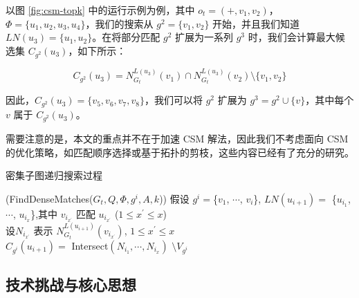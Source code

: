 以图 \ref{fig:csm-topk} 中的运行示例为例，其中 $o_t = (+,v_1,v_2)$，$\Phi = \{u_1,u_2,u_3,u_4\}$，我们的搜索从 $g^2 = \{v_1,v_2\}$ 开始，并且我们知道 $LN(u_3) = \{u_1, u_2\}$。在将部分匹配 $g^2$ 扩展为一系列 $g^3$ 时，我们会计算最大候选集 $C_{g^{2}}(u_3)$，如下所示：

\[
	C_{g^{2}}(u_{3}) =  N_{G_t}^{L(u_{3})}(v_{1})\cap N_{G_t}^{L(u_{3})}(v_{2})  \setminus \{v_1, v_2\}
\]

因此，$C_{g^{2}}(u_3) = \{v_5, v_6, v_7, v_8\}$，我们可以将 $g^2$ 扩展为 $g^3 = g^2 \cup \{v\}$，其中每个 $v$ 属于 $C_{g^{2}}(u_3)$。

需要注意的是，本文的重点并不在于加速 CSM 解法，因此我们不考虑面向 CSM 的优化策略，如匹配顺序选择或基于拓扑的剪枝，这些内容已经有了充分的研究。


\begin{algorithm}[h!]
	\small
	\caption{密集子图递归搜索过程}
	\label{alg:find-dense-matches}
	\iFunc(FindDenseMatches{(}$G_t, Q, \Phi, g^i, A, k${)})
	{
		假设 $g^{i}=$\{$v_{1}$, $\cdots$, $v_{i}$\}, $LN(u_{i+1})=$ \{$u_{i_1}$, $\cdots$, $u_{i_x}$\},其中 $v_{i_{x^\prime}}$ 匹配 $u_{i_{x^\prime}}$ ($1\leq x^\prime\leq x$)  \label{code:base-extension:begin} \\
		设$N_{i_{x^\prime}}$ 表示 $N_{G_t}^{L(u_{i+1})}(v_{i_{x^\prime}})$, $1\leq x^\prime\leq x$  \label{code:base-intersect:start} \\
		$C_{g^i}(u_{i+1})= $ Intersect$(N_{i_1}, \cdots, N_{i_x})$ $\setminus V_{g^i}$  \label{code:intersect}  \label{code:base-intersect:end}\\
		\Return 
	}
\end{algorithm}	

\subsection{技术挑战与核心思想}
